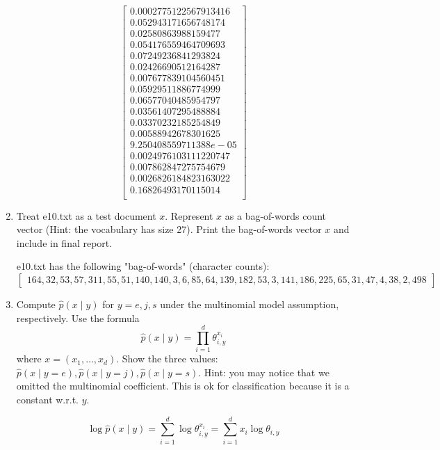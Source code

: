 \documentclass[a4paper]{article}
\theoremstyle{definition}
\newenvironment{soln}{
    \leavevmode\color{blue}\ignorespaces
}{}
\begin{document}
\begin{enumerate}
\begin{soln}
$$\begin{bmatrix}
		0.0002775122567913416\\
		0.052943171656748174\\
		0.02580863988159477\\
		0.054176559464709693\\
		0.07249236841293824\\
		0.02426690512164287\\
		0.007677839104560451\\
		0.05929511886774999\\
		0.06577040485954797\\
		0.03561407295488884\\
		0.03370232185254849\\
		0.00588942678301625\\
		9.250408559711388e-05\\
		0.0024976103111220747\\
		0.007862847275754679\\
		0.0026826184823163022\\
		0.16826493170115014\\
	\end{bmatrix}$$
\end{soln}

\item
Treat e10.txt as a test document $x$.
Represent $x$ as a bag-of-words count vector (Hint: the vocabulary has size 27).
Print the bag-of-words vector $x$ and include in final report.

\begin{soln}
	e10.txt has the following "bag-of-words" (character counts):
	$$\begin{bmatrix}
		164,  32,  53,  57, 311,  55,  51, 140, 140,   3,   6,  85,  64,
		139, 182,  53,   3, 141, 186, 225,  65,  31,  47,   4,  38,   2,
		498
	\end{bmatrix}$$
\end{soln}

\item
Compute $\hat p(x \mid y)$ for $y=e, j, s$ under the multinomial model assumption, respectively.
Use the formula
$$\hat p(x \mid y) = \prod_{i=1}^d \theta_{i, y}^{x_i}$$
where $x=(x_1, \ldots, x_d)$.
Show the three values: $\hat p(x \mid y=e), \hat p(x \mid y=j), \hat p(x \mid y=s)$.
Hint: you may notice that we omitted the multinomial coefficient.  This is ok for classification because it is a constant w.r.t. $y$.

\begin{soln}
	$$\log \hat p(x \mid y) = \sum_{i=1}^{d} \log \theta_{i, y}^{x_i} = \sum_{i=1}^{d} x_i \log \theta_{i, y}$$
	

\end{soln}
\end{enumerate}
\end{document}
